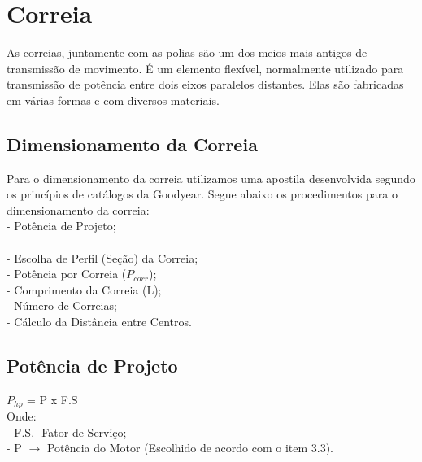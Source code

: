 \documentclass[a4paper, 11pt]{article}
\begin{document}
\section{Correia}
As correias, juntamente com as polias s\~ao um dos meios mais antigos de
transmiss\~ao de movimento. \'E um elemento flex\'ivel, normalmente utilizado para
transmiss\~ao de pot\^encia entre dois eixos paralelos distantes. Elas s\~ao fabricadas
em v\'arias formas e com diversos materiais.\\
\subsection{Dimensionamento da Correia}
Para o dimensionamento da correia utilizamos uma apostila desenvolvida
segundo os princípios de cat\'alogos da Goodyear.
Segue abaixo os procedimentos para o dimensionamento da correia:\\
- Pot\^encia de Projeto;\\\\
- Escolha de Perfil (Se\c{c}\~ao) da Correia;\\
- Pot\^encia por Correia ($P_{corr}$);\\
- Comprimento da Correia (L);\\
- N\'umero de Correias;\\
- C\'alculo da Dist\^ancia entre Centros.\\
\subsection{Pot\^encia de Projeto}
${P_{hp}}$ = P x F.S\\
Onde:\\- F.S.- Fator de Serviço;\\
- P $\rightarrow$ Pot\^encia do Motor (Escolhido de acordo com o item 3.3).\\
\end{document}
